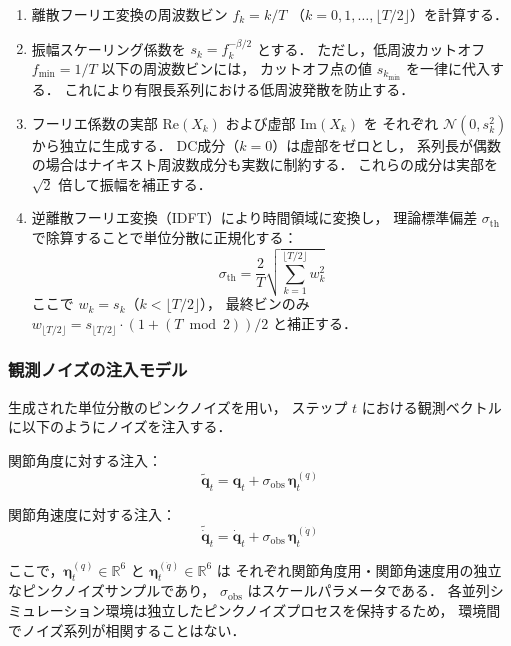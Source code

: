 \begin{enumerate}
  \item 離散フーリエ変換の周波数ビン $f_k = k / T$
        （$k = 0, 1, \ldots, \lfloor T/2 \rfloor$）を計算する．
  \item 振幅スケーリング係数を
        $s_k = f_k^{-\beta/2}$ とする．
        ただし，低周波カットオフ $f_{\min} = 1/T$ 以下の周波数ビンには，
        カットオフ点の値 $s_{k_{\min}}$ を一律に代入する．
        これにより有限長系列における低周波発散を防止する．
  \item フーリエ係数の実部 $\mathrm{Re}(X_k)$ および虚部 $\mathrm{Im}(X_k)$ を
        それぞれ $\mathcal{N}(0, s_k^2)$ から独立に生成する．
        DC成分（$k=0$）は虚部をゼロとし，
        系列長が偶数の場合はナイキスト周波数成分も実数に制約する．
        これらの成分は実部を $\sqrt{2}$ 倍して振幅を補正する．
  \item 逆離散フーリエ変換（IDFT）により時間領域に変換し，
        理論標準偏差 $\sigma_{\mathrm{th}}$ で除算することで単位分散に正規化する：
        \begin{equation}
          \sigma_{\mathrm{th}} = \frac{2}{T} \sqrt{\sum_{k=1}^{\lfloor T/2 \rfloor} w_k^2}
          \label{eq:sigma_th}
        \end{equation}
        ここで $w_k = s_k$（$k < \lfloor T/2 \rfloor$），
        最終ビンのみ $w_{\lfloor T/2 \rfloor} = s_{\lfloor T/2 \rfloor} \cdot (1 + (T \bmod 2)) / 2$
        と補正する．
\end{enumerate}

\subsubsection{観測ノイズの注入モデル}

生成された単位分散のピンクノイズを用い，
ステップ $t$ における観測ベクトルに以下のようにノイズを注入する．

関節角度に対する注入：
\begin{equation}
  \tilde{\boldsymbol{q}}_t = \boldsymbol{q}_t + \sigma_{\mathrm{obs}} \, \boldsymbol{\eta}_t^{(q)}
  \label{eq:obs_noise_pos}
\end{equation}

関節角速度に対する注入：
\begin{equation}
  \tilde{\dot{\boldsymbol{q}}}_t = \dot{\boldsymbol{q}}_t + \sigma_{\mathrm{obs}} \, \boldsymbol{\eta}_t^{(\dot{q})}
  \label{eq:obs_noise_vel}
\end{equation}

ここで，$\boldsymbol{\eta}_t^{(q)} \in \mathbb{R}^{6}$ と
$\boldsymbol{\eta}_t^{(\dot{q})} \in \mathbb{R}^{6}$ は
それぞれ関節角度用・関節角速度用の独立なピンクノイズサンプルであり，
$\sigma_{\mathrm{obs}}$ はスケールパラメータである．
各並列シミュレーション環境は独立したピンクノイズプロセスを保持するため，
環境間でノイズ系列が相関することはない．

